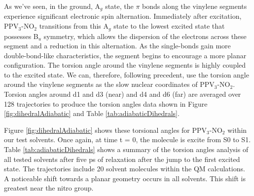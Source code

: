 As we've seen, in the ground, A\(_g\) state, the \(\pi\) bonds along the vinylene segments experience significant electronic spin alternation. Immediately after excitation, PPV\(_3\)-NO\(_2\) transitions from this A\(_g\) state to the lowest excited state that possesses B\(_u\) symmetry, which allows the dispersion of the electrons across these segment and a reduction in this alternation. As the single-bonds gain more double-bond-like characteristics, the segment begins to encourage a more planar configuration.  The torsion angle around the vinylene segments is highly coupled to the excited state.\cite{nelson2011nonadiabatic,panda2013electronically}
We can, therefore, following precedent, use the torsion angle around the vinylene segments as the slow nuclear coordinates of PPV\(_3\)-NO\(_2\). \cite{Clark2012,barford2011ultrafast}
Torsion angles around d1 and d3 (near) and d4 and d6 (far) are averaged over 128 trajectories to produce the torsion angles data shown in Figure \ref{fig:dihedralAdiabatic} and Table \ref{tab:adiabaticDihedrals}.

Figure \ref{fig:dihedralAdiabatic} shows these torsional angles for PPV\(_3\)-NO\(_2\) within our test solvents. Once again, at time t = 0, the molecule is excite from S0 to S1.  
Table \ref{tab:adiabaticDihedrals} shows a summary of the torsion angles analysis of all tested solvents after five ps of relaxation after the jump to the first excited state.
The trajectories include 20 solvent molecules within the QM calculations.
A noticeable shift towards a planar geometry occurs in all solvents.
This shift is greatest near the nitro group.
